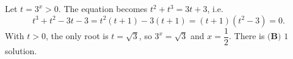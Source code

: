 Let $t=3^x>0$. The equation becomes $t^2+t^3=3t+3$, i.e.
\[t^3+t^2-3t-3=t^2(t+1)-3(t+1)=(t+1)\left(t^2-3\right)=0.\]
With $t>0$, the only root is $t=\sqrt3$, so $3^x=\sqrt3$ and $x=\dfrac12$. There is $\boxed{\textbf{(B) } 1}$ solution.
